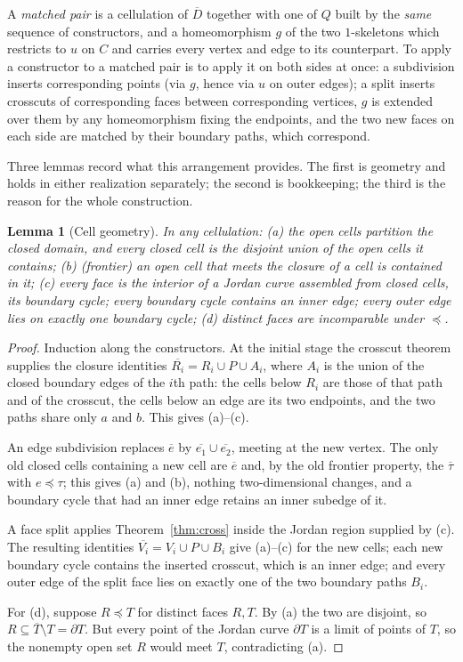 \documentclass[11pt,a4paper]{article}
\theoremstyle{jsplain}
\newtheorem{lemma}[theorem]{Lemma}
\theoremstyle{jsdefn}
\begin{document}
A \emph{matched pair} is a cellulation of $\overline D$ together with
one of $Q$ built by the \emph{same} sequence of constructors, and a
homeomorphism $g$ of the two $1$-skeletons which restricts to $u$ on
$C$ and carries every vertex and edge to its counterpart. To apply a
constructor to a matched pair is to apply it on both sides at once: a
subdivision inserts corresponding points (via $g$, hence via $u$ on
outer edges); a split inserts crosscuts of corresponding faces between
corresponding vertices, $g$ is extended over them by any homeomorphism
fixing the endpoints, and the two new faces on each side are matched by
their boundary paths, which correspond.

Three lemmas record what this arrangement provides. The first is
geometry and holds in either realization separately; the second is
bookkeeping; the third is the reason for the whole construction.

\begin{lemma}[Cell geometry]\label{lem:cellgeom}
In any cellulation:
\textup{(a)} the open cells partition the closed domain, and every
closed cell is the disjoint union of the open cells it contains;
\textup{(b)} \textup(frontier\textup) an open cell that meets the
closure of a cell is contained in it;
\textup{(c)} every face is the interior of a Jordan curve assembled
from closed cells, its \emph{boundary cycle}; every boundary cycle
contains an inner edge; every outer edge lies on exactly one boundary
cycle;
\textup{(d)} distinct faces are incomparable under $\preceq$.
\end{lemma}
\begin{proof}
Induction along the constructors. At the initial stage the crosscut
theorem supplies the closure identities
$\overline{R_i}=R_i\cup P\cup A_i$, where $A_i$ is the union of the
closed boundary edges of the $i$th path: the cells below $R_i$ are
those of that path and of the crosscut, the cells below an edge are its
two endpoints, and the two paths share only $a$ and $b$. This gives
(a)--(c).

An edge subdivision replaces $\overline e$ by
$\overline{e_1}\cup\overline{e_2}$, meeting at the new vertex. The only
old closed cells containing a new cell are $\overline e$ and, by the
old frontier property, the $\overline\tau$ with $e\preceq\tau$; this
gives (a) and (b), nothing two-dimensional changes, and a boundary
cycle that had an inner edge retains an inner subedge of it.

A face split applies Theorem~\ref{thm:cross} inside the Jordan region
supplied by (c). The resulting identities
$\overline{V_i}=V_i\cup P\cup B_i$ give (a)--(c) for the new cells;
each new boundary cycle contains the inserted crosscut, which is an
inner edge; and every outer edge of the split face lies on exactly one
of the two boundary paths $B_i$.

For (d), suppose $R\preceq T$ for distinct faces $R,T$. By (a) the two
are disjoint, so $R\subseteq\overline T\setminus T=\partial T$. But
every point of the Jordan curve $\partial T$ is a limit of points of
$T$, so the nonempty open set $R$ would meet $T$, contradicting (a).
\end{proof}
\end{document}
